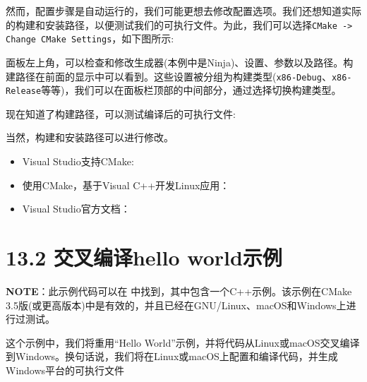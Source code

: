 然而，配置步骤是自动运行的，我们可能更想去修改配置选项。我们还想知道实际的构建和安装路径，以便测试我们的可执行文件。为此，我们可以选择\texttt{CMake -> Change CMake Settings}，如下图所示:


面板左上角，可以检查和修改生成器(本例中是Ninja)、设置、参数以及路径。构建路径在前面的显示中可以看到。这些设置被分组为构建类型(\texttt{x86-Debug}、\texttt{x86-Release}等等)，我们可以在面板栏顶部的中间部分，通过选择切换构建类型。

现在知道了构建路径，可以测试编译后的可执行文件:


当然，构建和安装路径可以进行修改。


\begin{itemize}
\item Visual Studio支持CMake: 

\item 使用CMake，基于Visual C++开发Linux应用：

\item Visual Studio官方文档：

\end{itemize}


\section{13.2 交叉编译hello world示例}

\begin{myInfoBox}
\textbf{NOTE}：此示例代码可以在  中找到，其中包含一个C++示例。该示例在CMake 3.5版(或更高版本)中是有效的，并且已经在GNU/Linux、macOS和Windows上进行过测试。
\end{myInfoBox}

这个示例中，我们将重用“Hello World”示例，并将代码从Linux或macOS交叉编译到Windows。换句话说，我们将在Linux或macOS上配置和编译代码，并生成Windows平台的可执行文件

